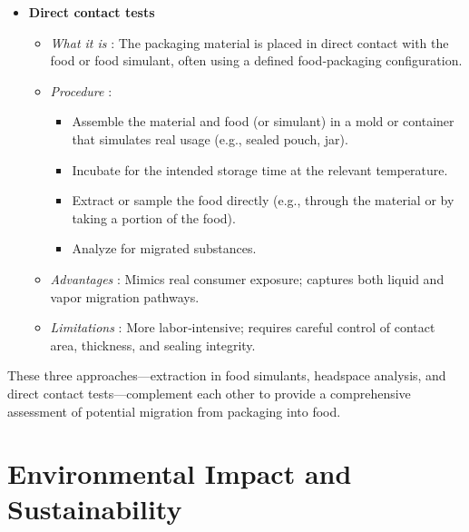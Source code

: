\documentclass[11pt,a4paper]{article}
\begin{document}
\begin{itemize}
\begin{itemize}
\begin{itemize}
\item Sample the gas phase with a gas sampling needle or syringe.
\item Analyze via GC‑FID, GC‑MS, or PTR‑MS.
    \end{itemize}
\item \textit{Applications} : Assessment of aromas, flavor compounds, or volatile contaminants.
\item \textit{Advantages} : Sensitive to low‑concentration volatiles; minimal sample preparation.
\item \textit{Limitations} : Does not capture non‑volatile migration; results depend on equilibrium time and temperature.
  \end{itemize}
\item 
\textbf{Direct contact tests}
  \begin{itemize}
\item \textit{What it is} : The packaging material is placed in direct contact with the food or food simulant, often using a defined food‑packaging configuration.
\item 
\textit{Procedure} :
    \begin{itemize}
\item Assemble the material and food (or simulant) in a mold or container that simulates real usage (e.g., sealed pouch, jar).
\item Incubate for the intended storage time at the relevant temperature.
\item Extract or sample the food directly (e.g., through the material or by taking a portion of the food).
\item Analyze for migrated substances.
    \end{itemize}
\item \textit{Advantages} : Mimics real consumer exposure; captures both liquid and vapor migration pathways.
\item \textit{Limitations} : More labor‑intensive; requires careful control of contact area, thickness, and sealing integrity.
  \end{itemize}
\end{itemize}

These three approaches—extraction in food simulants, headspace analysis, and direct contact tests—complement each other to provide a comprehensive assessment of potential migration from packaging into food.

\section{Environmental Impact and Sustainability}
\end{document}
